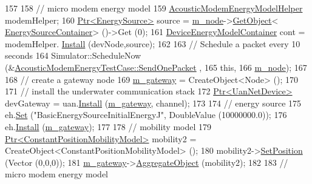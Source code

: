 \begin{DoxyCode}
157 
158   \textcolor{comment}{// micro modem energy model}
159   \hyperlink{classns3_1_1AcousticModemEnergyModelHelper}{AcousticModemEnergyModelHelper} modemHelper;
160   \hyperlink{classns3_1_1Ptr}{Ptr<EnergySource>} source = \hyperlink{classAcousticModemEnergyTestCase_a70215894f46e0f4c11d7adb48fce7d44}{m\_node}->\hyperlink{classns3_1_1Object_a13e18c00017096c8381eb651d5bd0783}{GetObject}<
      \hyperlink{classns3_1_1EnergySourceContainer}{EnergySourceContainer}> ()->Get (0);
161   \hyperlink{classns3_1_1DeviceEnergyModelContainer}{DeviceEnergyModelContainer} cont = modemHelper.
      \hyperlink{classns3_1_1DeviceEnergyModelHelper_a085a4854e96ff8f314a9ebec93e6c4eb}{Install} (devNode,source);
162 
163   \textcolor{comment}{// Schedule a packet every 10 seconds}
164   Simulator::ScheduleNow (&\hyperlink{classAcousticModemEnergyTestCase_a540ee1e0ec5812bbeb11c3ead857db1f}{AcousticModemEnergyTestCase::SendOnePacket}
      ,
165                           \textcolor{keyword}{this},
166                           \hyperlink{classAcousticModemEnergyTestCase_a70215894f46e0f4c11d7adb48fce7d44}{m\_node});
167 
168   \textcolor{comment}{// create a gateway node}
169   \hyperlink{classAcousticModemEnergyTestCase_a132723c335a308fc1d4be16bc79f49cf}{m\_gateway} = CreateObject<Node> ();
170 
171   \textcolor{comment}{// install the underwater communication stack}
172   \hyperlink{classns3_1_1Ptr}{Ptr<UanNetDevice>} devGateway = uan.\hyperlink{classns3_1_1UanHelper_a283475798bb2df2ff11c53b68d2f1361}{Install} (\hyperlink{classAcousticModemEnergyTestCase_a132723c335a308fc1d4be16bc79f49cf}{m\_gateway}, channel);
173 
174   \textcolor{comment}{// energy source}
175   eh.\hyperlink{classns3_1_1BasicEnergySourceHelper_aa07c8c1c4a4ced92b8fc51bf4be4de3f}{Set} (\textcolor{stringliteral}{"BasicEnergySourceInitialEnergyJ"}, DoubleValue (10000000.0));
176   eh.\hyperlink{classns3_1_1EnergySourceHelper_ac52e48ef79c83537cc0bba02df8d91a1}{Install} (\hyperlink{classAcousticModemEnergyTestCase_a132723c335a308fc1d4be16bc79f49cf}{m\_gateway});
177 
178   \textcolor{comment}{// mobility model}
179   \hyperlink{classns3_1_1Ptr}{Ptr<ConstantPositionMobilityModel>} mobility2 = 
      CreateObject<ConstantPositionMobilityModel> ();
180   mobility2->\hyperlink{classns3_1_1MobilityModel_ac584b3d5a309709d2f13ed6ada1e7640}{SetPosition} (Vector (0,0,0));
181   \hyperlink{classAcousticModemEnergyTestCase_a132723c335a308fc1d4be16bc79f49cf}{m\_gateway}->\hyperlink{classns3_1_1Object_a79dd435d300f3deca814553f561a2922}{AggregateObject} (mobility2);
182 
183   \textcolor{comment}{// micro modem energy model}

\end{DoxyCode}

